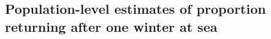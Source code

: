 \documentclass[12pt]{article}
\newcommand{\So}{$S_{1}$\xspace}
\newcommand{\St}{$S_{2}$\xspace}
\newcommand{\Pg}{$P_r$\xspace}
\begin{document}
\clearpage

\subsection*{Population-level estimates of proportion returning after one winter at sea}



\hspace{8em}







\end{document}
